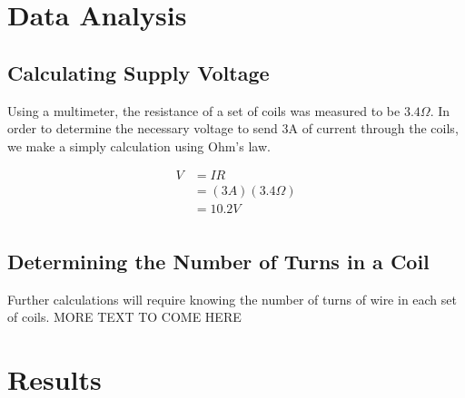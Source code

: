 \documentclass[a4paper]{article}
\begin{document}
\section{Data Analysis}


\subsection{Calculating Supply Voltage}
Using a multimeter, the resistance of a set of coils was measured to be $3.4 \Omega$. In order to determine the necessary voltage to send 3A of current through the coils, we make a simply calculation using Ohm's law.

\begin{align*}
V &= IR \\
  &= (3A)(3.4 \Omega) \\
  &= 10.2V \\
\end{align*}

\subsection{Determining the Number of Turns in a Coil}
Further calculations will require knowing the number of turns of wire in each set of coils. MORE TEXT TO COME HERE









\section{Results}



\end{document}
